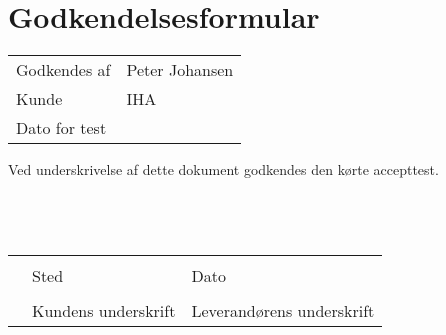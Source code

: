 \newpage
\section{Godkendelsesformular}
\begin{longtabu} to 
	
	\midrule
	Godkendes af & Peter Johansen \\
	Kunde	&	IHA \\
	Dato for test & \makebox[1.5in]{\hrulefill} \\
\end{longtabu}

Ved underskrivelse af dette dokument godkendes den kørte accepttest. 
\\
\\
\\
\\
\noindent \begin{tabular}{lll} 
	& 	\makebox[2.5in]{\hrulefill} 	& 	\makebox[2.5in]{\hrulefill}\\
	&	Sted						&	Dato\\[7ex]
	& 	\makebox[2.5in]{\hrulefill} 	& 	\makebox[2.5in]{\hrulefill}\\
	& 	Kundens underskrift 		& 	Leverandørens underskrift\\[7ex]

\end{tabular}
